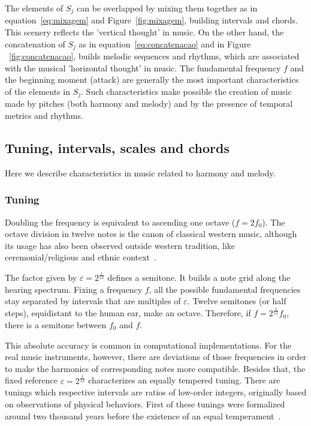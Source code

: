 \documentclass[
 aip,
 jmp,
 amsmath,amssymb,
 reprint,
]{revtex4-1}
\begin{document}
The elements of $S_j$ can be overlapped by mixing them together as in
equation~\ref{eq:mixagem} and Figure~\ref{fig:mixagem}, building intervals
and chords. This scenery reflects the 'vertical thought' in music. On the other hand, the concatenation of $S_j$
as in equation~\ref{eq:concatenacao} and in Figure ~\ref{fig:concatenacao},
builds melodic sequences and rhythms, which are associated with the musical
'horizontal thought' in music. The fundamental frequency $f$ and the beginning moment
(attack) are generally the most important characteristics of the elements in
$S_j$. Such characteristics make possible the creation of music made by pitches (both
harmony and melody) and by the presence of temporal metrics and rhythms.

\subsection{Tuning, intervals, scales and chords}\label{subsec:afinacao}

Here we describe characteristics in music related to harmony and melody.

\subsubsection{Tuning}

Doubling the frequency is equivalent to ascending one octave ($f=2f_0$).
The octave division in twelve notes is the canon of classical western music, although its usage has also been observed
outside western tradition, like ceremonial/religious and ethnic context~\cite{Wisnick}.

The factor given by $\varepsilon=2^{\frac{1}{12}}$ defines a semitone. It builds a note
grid along the hearing spectrum. Fixing a frequency $f$, all the possible
fundamental frequencies stay separated by intervals that are multiples of
$\varepsilon$. Twelve semitones (or half steps), equidistant to the human ear, make an
octave. Therefore, if $f=2^{\frac{1}{12}}f_0$, there is a semitone between
$f_0$ and $f$.

This absolute accuracy is common in computational implementations. For the real
music instruments, however, there are deviations of those frequencies in order to make
the harmonics of corresponding notes more compatible. Besides that, the fixed reference
$\varepsilon=2^{\frac{1}{12}}$ characterizes an equally tempered tuning. There
are tunings which respective intervals are ratios of low-order integers, originally based
on observations of physical behaviors. First of these tunings were formalized
around two thousand years before the existence of an equal temperament~\cite{Roederer}.
\end{document}
